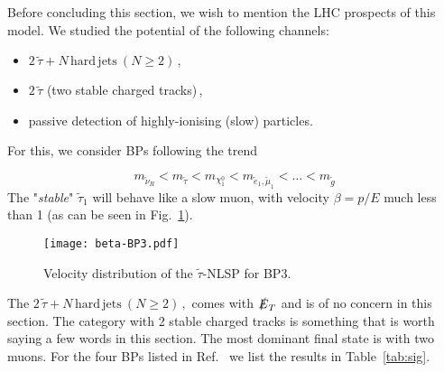 \documentclass[10pt]{article}
\newcommand{\stau}{\tilde{\tau}}
\begin{document}
Before concluding this section, we wish to mention the LHC prospects of this model. We studied the potential of the following channels:

\begin{itemize}
	\item $2 \, \stau + N \,\textrm{hard}\, \textrm{jets}\: (N\ge 2)\,,$
	\item $2 \, \stau$ (two stable charged tracks)\,,
	\item passive detection of highly-ionising (slow) particles.
\end{itemize}

For this, we consider BPs following the trend

\begin{equation}
m_{\tilde{\nu}_{R}} < m_{\stau} < m_{\chi_1^0} < m_{\tilde{e}_1, \tilde{\mu}_1} < \ldots < m_{\tilde{g}} \nonumber
\end{equation}
The "\textit{stable}" $\tilde{\tau}_1$ will behave like a slow muon, with velocity $\beta = p/E$ much less than 1 (as can be seen in Fig.~\ref{fig:vel-dist-BP1}).

\begin{figure}
	\begin{center}
		{
			\texttt{[image: beta-BP3.pdf]}
			\caption{Velocity distribution of the $\stau$-NLSP for BP3.}
			\label{fig:vel-dist-BP1}
		}
	\end{center}
\end{figure}

The $2 \, \stau + N \,\textrm{hard}\, \textrm{jets}\: (N\ge 2)\,,$ comes with $\slashed{E}_T$ and is of no concern in this section. The category with 2 stable charged tracks is something that is worth saying a few words in this section. The most dominant final state is with two muons. For the four BPs listed in Ref.~\cite{Banerjee:2016uyt} we list the results in Table~\ref{tab:sig}.
\end{document}
